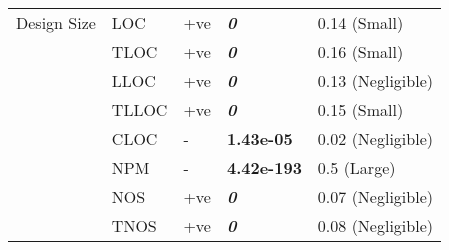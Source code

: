 \begin{table}
\begin{adjustbox}{width=1.0\textwidth,center}
\begin{tabular}{lllll}
\\ 
Design Size &  LOC & +ve & \textbf{\textit{0}} &   0.14 (Small)

\\
         &  \cellcolor{gray!30}TLOC & \cellcolor{gray!30}+ve &   \cellcolor{gray!30}\textit{\textbf{0}} &  \cellcolor{gray!30}0.16 (Small)

\\
            &  LLOC &  +ve &  \textbf{\textit{0}} &   0.13 (Negligible)

\\
         &  \cellcolor{gray!30}TLLOC & \cellcolor{gray!30}+ve & \cellcolor{gray!30}\textit{\textbf{0}}  &   \cellcolor{gray!30}0.15 (Small)

\\
            &   CLOC & - &  \textbf{1.43e-05} &   0.02 (Negligible)

\\
            &  \cellcolor{gray!30}NPM & \cellcolor{gray!30}- & \cellcolor{gray!30}\textbf{4.42e-193} & \cellcolor{gray!30}0.5 (Large)

\\
         &  NOS &  +ve&  \textit{\textbf{0}} &  0.07 (Negligible)

\\
         &  \cellcolor{gray!30}TNOS & \cellcolor{gray!30}+ve & \cellcolor{gray!30}\textit{\textbf{0}}  &  \cellcolor{gray!30}0.08 (Negligible)

\\
\bottomrule
\end{tabular}
\end{adjustbox}
\end{table}
